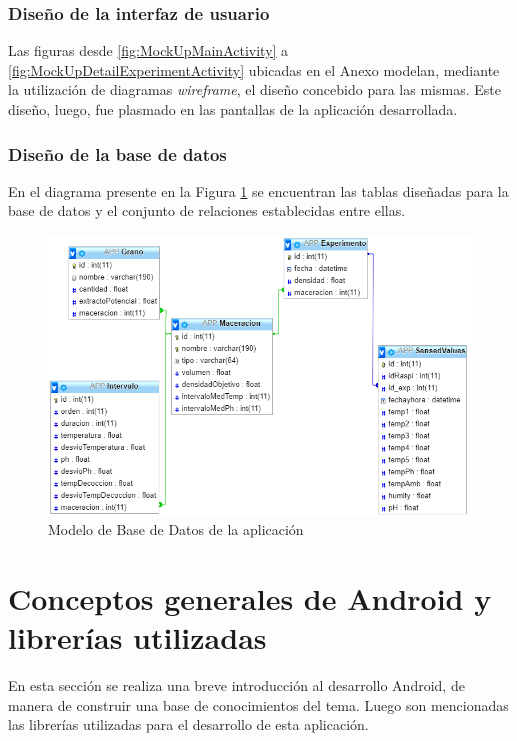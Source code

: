     \subsubsection{Diseño de la interfaz de usuario}
        Las figuras desde \ref{fig:MockUpMainActivity} a %
        \ref{fig:MockUpDetailExperimentActivity} ubicadas en el Anexo modelan, mediante la utilización de diagramas \textit{wireframe}, el diseño concebido para las mismas. Este diseño, luego, fue plasmado en las pantallas de la aplicación desarrollada.
        

    \subsubsection{Diseño de la base de datos}
        En el diagrama presente en la Figura \ref{fig:DiagramaBdApp} se encuentran las tablas diseñadas para la base de datos y el conjunto de relaciones establecidas entre ellas.
        
        \begin{figure}[h]
            \centering
            \includegraphics[scale=0.8]{DiagramaBaseDeDatosAPP.jpg}
            \caption{Modelo de Base de Datos de la aplicación}
            \label{fig:DiagramaBdApp}
        \end{figure}

\section{Conceptos generales de Android y librerías utilizadas}
    \par En esta sección se realiza una breve introducción al desarrollo Android, de manera de construir una base de conocimientos del tema. Luego son mencionadas las librerías utilizadas para el desarrollo de esta aplicación.
    

